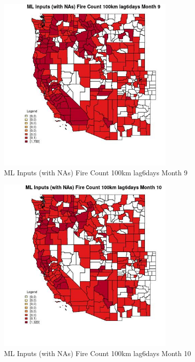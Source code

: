 \clearpage 

\begin{figure} 
\centering  
\includegraphics[width=0.77\textwidth]{Code_Outputs/Report_ML_input_PM25_Step4_part_e_de_duplicated_aves_compiled_2019-05-21wNAs_CountyFire_Count_100km_lag6daysmedianMonth9.jpg} 
\caption{\label{fig:Report_ML_input_PM25_Step4_part_e_de_duplicated_aves_compiled_2019-05-21wNAsCountyFire_Count_100km_lag6daysmedianMonth9}ML Inputs (with NAs) Fire Count 100km lag6days Month 9} 
\end{figure} 
 

\begin{figure} 
\centering  
\includegraphics[width=0.77\textwidth]{Code_Outputs/Report_ML_input_PM25_Step4_part_e_de_duplicated_aves_compiled_2019-05-21wNAs_CountyFire_Count_100km_lag6daysmedianMonth10.jpg} 
\caption{\label{fig:Report_ML_input_PM25_Step4_part_e_de_duplicated_aves_compiled_2019-05-21wNAsCountyFire_Count_100km_lag6daysmedianMonth10}ML Inputs (with NAs) Fire Count 100km lag6days Month 10} 
\end{figure} 
 

